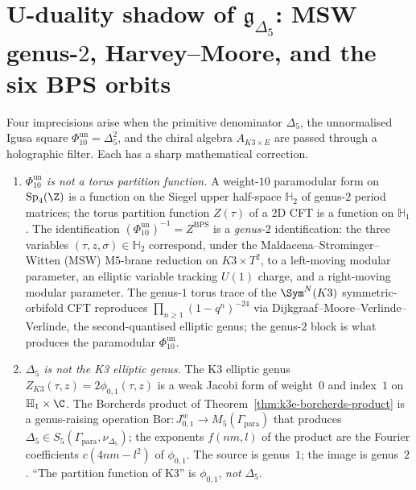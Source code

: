 \section{U-duality shadow of \texorpdfstring{$\mathfrak{g}_{\Delta_5}$}{g-Delta5}: MSW genus-\texorpdfstring{$2$}{2}, Harvey--Moore, and the six BPS orbits}
\label{sec:k3e-u-duality-shadow}

\begin{remark}
\label{rem:k3e-holographic-scope}
%
%
%
%
Four imprecisions arise when the primitive denominator $\Delta_5$, the unnormalised Igusa square $\Phi_{10}^{\mathrm{un}}=\Delta_5^2$, and the chiral algebra $A_{K3\times E}$ are passed through a holographic filter. Each has a sharp mathematical correction.
\begin{enumerate}[label=\textup{(\roman*)}]
\item \emph{$\Phi_{10}^{\mathrm{un}}$ is not a torus partition function.} A weight-$10$ paramodular form on $\mathrm{Sp}_4(\Z)$ is a function on the Siegel upper half-space $\mathbb{H}_2$ of genus-$2$ period matrices; the torus partition function $Z(\tau)$ of a $2$D CFT is a function on $\mathbb{H}_1$. The identification $(\Phi_{10}^{\mathrm{un}})^{-1} = Z^{\mathrm{BPS}}$ is a \emph{genus-$2$} identification: the three variables $(\tau, z, \sigma) \in \mathbb{H}_2$ correspond, under the Maldacena--Strominger--Witten (MSW) M$5$-brane reduction on $K3\times T^2$, to a left-moving modular parameter, an elliptic variable tracking $U(1)$ charge, and a right-moving modular parameter. The genus-$1$ torus trace of the $\Sym^N(K3)$ symmetric-orbifold CFT reproduces $\prod_{n\geq 1}(1-q^n)^{-24}$ via Dijkgraaf--Moore--Verlinde--Verlinde, the second-quantised elliptic genus; the genus-$2$ block is what produces the paramodular $\Phi_{10}^{\mathrm{un}}$.
\item \emph{$\Delta_5$ is not the K3 elliptic genus.} The K3 elliptic genus $Z_{K3}(\tau, z) = 2\phi_{0,1}(\tau, z)$ is a weak Jacobi form of weight~$0$ and index~$1$ on $\mathbb{H}_1\times\C$. The Borcherds product of Theorem~\ref{thm:k3e-borcherds-product} is a genus-raising operation $\mathrm{Bor}\colon J_{0,1}^{w} \to M_5(\Gamma_{\mathrm{para}})$ that produces $\Delta_5 \in S_5(\Gamma_{\mathrm{para}}, \nu_{\Delta_5})$; the exponents $f(nm, l)$ of the product are the Fourier coefficients $c(4nm - l^2)$ of $\phi_{0,1}$. The source is genus~$1$; the image is genus~$2$. ``The partition function of K3'' is $\phi_{0,1}$, \emph{not} $\Delta_5$.

\end{enumerate}
\end{remark}

